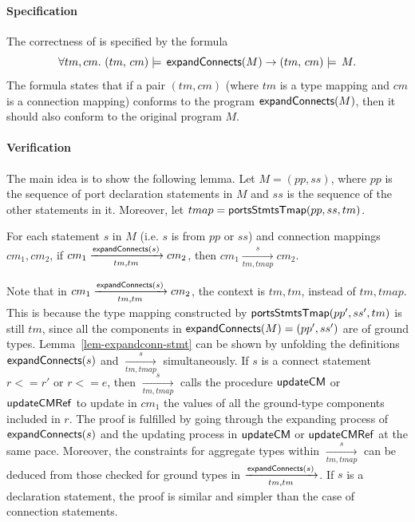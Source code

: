 

\paragraph*{Specification}
The correctness of {\expandconnects} is specified by the formula 
%
$$\forall tm, cm.\ (tm,\,cm) \models \, {\sf expandConnects}(M) \rightarrow (tm,\,cm) \models \,M. $$
%
The formula states that if a pair $(tm, cm)$ (where $tm$ is a type mapping and $cm$ is a connection mapping) conforms to the program ${\sf expandConnects}(M)$, then it should
also conform to the original program $M$.  

\paragraph*{Verification} The main idea is to show the following lemma. Let $M = (pp, ss)$, where $pp$ is the sequence of port declaration statements in $M$ and $ss$ is the sequence of the other statements in it. 
Moreover, let $tmap = {\sf portsStmtsTmap}(pp, ss, tm)$. 
\begin{lemma}\label{lem-expandconn-stmt}
For each statement $s$ in $M$ (i.e. $s$ is from $pp$ or $ss$) and connection mappings $cm_1, cm_2$, 
if $cm_1 \xrightarrow[tm, tm]{{\sf expandConnects}(s)} cm_2$, then $cm_1 \xrightarrow[tm, tmap]{s} cm_2$. 
\end{lemma}
Note that in $cm_1 \xrightarrow[tm, tm]{{\sf expandConnects}(s)} cm_2$, the context is $tm, tm$, instead of $tm, tmap$. This is because the type mapping constructed by ${\sf portsStmtsTmap}(pp', ss', tm)$ is still $tm$, since all the components in ${\sf expandConnects}(M) = (pp', ss')$ are of ground types. 
Lemma~\ref{lem-expandconn-stmt} can be shown by unfolding the definitions ${\sf expandConnects}(s)$ and $\xrightarrow[tm, tmap]{s}$ simultaneously. 
If $s$ is a connect statement $r <= r'$ or $r <= e$, then $\xrightarrow[tm, tmap]{s}$ calls the procedure ${\sf updateCM}$ or ${\sf updateCMRef}$ to update in $cm_1$ the values of all the ground-type components included in $r$. The proof is fulfilled by going through the expanding process of ${\sf expandConnects}(s)$ and the updating process in ${\sf updateCM}$ or ${\sf updateCMRef}$ at the same pace.
Moreover, the {\typecompatible} constraints for aggregate types within $\xrightarrow[tm, tmap]{s}$ can be deduced from those checked for ground types in $\xrightarrow[tm, tm]{{\sf expandConnects}(s)}$.
If $s$ is a declaration statement, the proof is similar and simpler than the case of connection statements. 


